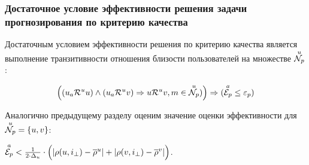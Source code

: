 \subsubsection{Достаточное условие эффективности решения задачи прогнозирования
по критерию качества}
\begin{trm}
\label{suf-cond-pred-srs}
Достаточным условием эффективности решения по критерию качества является выполнение транзитивности
отношения близости пользователей на множестве ${\overset{u}{\mathcal{N}_p}}$:

\begin{equation}
	\Big((u_a \mathcal{R}^u u) \wedge (u_a
	\mathcal{R}^u v)  \Rightarrow u \mathcal{R}^u v, m \in {\overset{u}{\mathcal{N}_p}})\Big) \Rightarrow ({\overset{a}{\mathcal{E}_{p}}} \le \varepsilon_p)
\end{equation}
\end{trm}

Аналогично предыдущему разделу оценим значение оценки эффективности для ${\overset{u}{\mathcal{N}_p}} = \{u,v\}$:

${\overset{a}{\mathcal{E}_{p}}} < \frac{1}{2 \cdot \Delta_u} \cdot \Big(|\rho(u,i_{\bot}) - \overline{\rho}^u| + |\rho(v,i_{\bot}) - \overline{\rho}^v|\Big)$.

